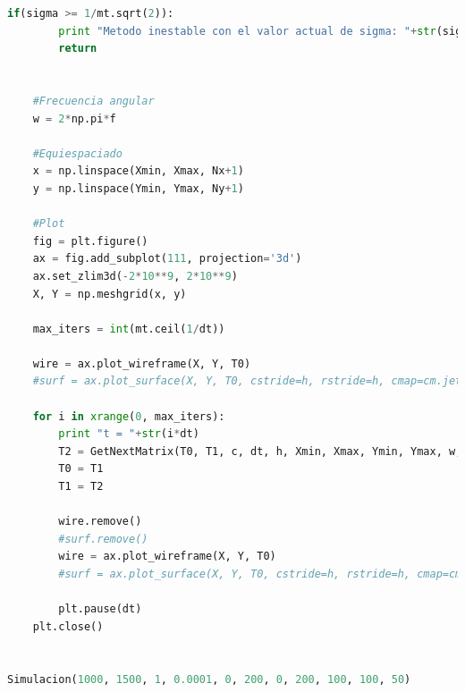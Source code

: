 \documentclass[letterpaper]{article}
\newcommand{\5}
{
\\[.5cm]
}
\begin{document}
\begin{lstlisting}[language=Python]
	if(sigma >= 1/mt.sqrt(2)):
		print "Metodo inestable con el valor actual de sigma: "+str(sigma)
		return
	

	#Frecuencia angular
	w = 2*np.pi*f

	#Equiespaciado
	x = np.linspace(Xmin, Xmax, Nx+1)
	y = np.linspace(Ymin, Ymax, Ny+1)

	#Plot
	fig = plt.figure()
	ax = fig.add_subplot(111, projection='3d')
	ax.set_zlim3d(-2*10**9, 2*10**9)
	X, Y = np.meshgrid(x, y)

	max_iters = int(mt.ceil(1/dt))

	wire = ax.plot_wireframe(X, Y, T0)
	#surf = ax.plot_surface(X, Y, T0, cstride=h, rstride=h, cmap=cm.jet)

	for i in xrange(0, max_iters):
		print "t = "+str(i*dt)
		T2 = GetNextMatrix(T0, T1, c, dt, h, Xmin, Xmax, Ymin, Ymax, w, q, p, i, U0)
		T0 = T1
		T1 = T2

		wire.remove()
		#surf.remove()
		wire = ax.plot_wireframe(X, Y, T0)
		#surf = ax.plot_surface(X, Y, T0, cstride=h, rstride=h, cmap=cm.jet)
	
		plt.pause(dt)
	plt.close()


Simulacion(1000, 1500, 1, 0.0001, 0, 200, 0, 200, 100, 100, 50)
\end{lstlisting}
\end{document}
